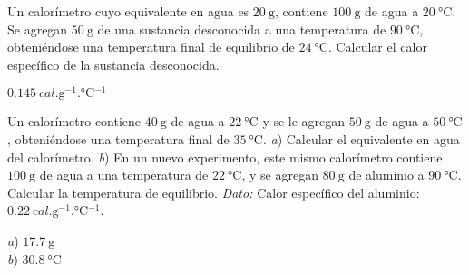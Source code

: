 %
\begin{Exercise}
  Un calorímetro cuyo equivalente en agua es $\SI{20}{\gram}$, contiene $\SI{100}{\gram}$ de agua a $\SI{20}{\celsius}$. Se agregan $\SI{50}{\gram}$ de una sustancia desconocida a una temperatura de $\SI{90}{\celsius}$, obteniéndose una temperatura final de equilibrio de $\SI{24}{\celsius}$. Calcular el calor específico de la sustancia desconocida.
\end{Exercise}
\begin{Answer}
  $\SI{0.145}{cal.\gram^{-1}.\celsius^{-1}}$
\end{Answer}
%
\begin{Exercise}
  {}{}
  Un calorímetro contiene $\SI{40}{\gram}$ de agua a $\SI{22}{\celsius}$ y se le agregan $\SI{50}{\gram}$ de agua a $\SI{50}{\celsius}$, obteniéndose una temperatura final de $\SI{35}{\celsius}$. \textit{a}) Calcular el equivalente en agua del calorímetro. \textit{b}) En un nuevo experimento, este mismo calorímetro contiene $\SI{100}{\gram}$ de agua a una temperatura de $\SI{22}{\celsius}$, y se agregan $\SI{80}{\gram}$ de aluminio a $\SI{90}{\celsius}$. Calcular la temperatura de equilibrio. \textit{Dato:} Calor específico del aluminio: $\SI{0.22}{cal.\gram^{-1}.\celsius^{-1}}$.
\end{Exercise}
\begin{Answer}
	\begin{minipage}[t]{.4\textwidth}
    \textit{a}) $\SI{17.7}{\gram}$\\ \textit{b}) $\SI{30.8}{\celsius}$
  \end{minipage}
\end{Answer}
%
